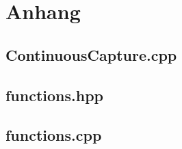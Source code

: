 \chapter*{Anhang}

\section*{ContinuousCapture.cpp}


\section*{functions.hpp}


\section*{functions.cpp}

